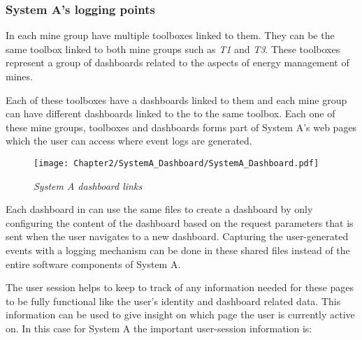 \subsubsection{System A's logging points}\label{sec:SystemA_LoggingPoints}
In  each mine group have multiple toolboxes linked to them. They can be the same toolbox linked to both mine groups such as \emph{T1} and \emph{T3}. These toolboxes represent a group of dashboards related to the aspects of energy management of mines.\par Each of these toolboxes have a dashboards linked to them and each mine group can have different dashboards linked to the to the same toolbox. Each one of these mine groups, toolboxes and dashboards forms part of System A's web pages which the user can access where event logs are generated.

\begin{figure}[!htb] %
	\centering %
	\texttt{[image: Chapter2/SystemA\_Dashboard/SystemA\_Dashboard.pdf]}
	\caption[System A dashboard links]
	{\textit{System A dashboard links}}\label{fig:ch2_SystemA_Dashboard}
\end{figure}

\clearpage

Each dashboard in  can use the same files to create a dashboard by only configuring the content of the dashboard based on the request parameters that is sent when the user navigates to a new dashboard. Capturing the user-generated events with a logging mechanism can be done in these shared files instead of the entire software components of System A.\par The user session helps to keep to track of any information needed for these pages to be fully functional like the user's identity and dashboard related data. This information can be used to give insight on which page the user is currently active on. In this case for System A the important user-session information is:

